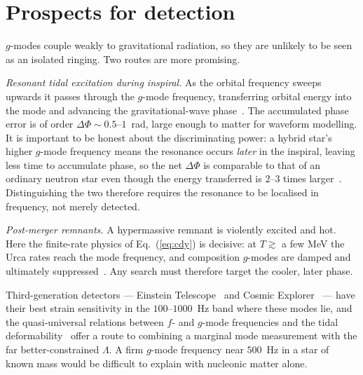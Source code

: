 \documentclass[aps,prd,twocolumn,superscriptaddress,nofootinbib,10pt]{revtex4-2}
\begin{document}
\section{Prospects for detection}

$g$-modes couple weakly to gravitational radiation, so they are unlikely to be
seen as an isolated ringing. Two routes are more promising.

\emph{Resonant tidal excitation during inspiral.} As the orbital frequency
sweeps upwards it passes through the $g$-mode frequency, transferring orbital
energy into the mode and advancing the gravitational-wave phase~\cite{Lai1994}.
The accumulated phase error is of order $\Delta\Phi\sim0.5$--$1$~rad, large
enough to matter for waveform modelling. It is important to be honest about the
discriminating power: a hybrid star's higher $g$-mode frequency means the
resonance occurs \emph{later} in the inspiral, leaving less time to accumulate
phase, so the net $\Delta\Phi$ is comparable to that of an ordinary neutron star
even though the energy transferred is $2$--$3$ times
larger~\cite{Jaikumar2021}. Distinguishing the two therefore requires the
resonance to be localised in frequency, not merely detected.

\emph{Post-merger remnants.} A hypermassive remnant is violently excited and
hot. Here the finite-rate physics of Eq.~(\ref{eq:cdy}) is decisive: at
$T\gtrsim$ a few MeV the Urca rates reach the mode frequency, and composition
$g$-modes are damped and ultimately suppressed~\cite{Counsell2025}. Any search
must therefore target the cooler, later phase.

Third-generation detectors --- Einstein Telescope~\cite{Punturo2010} and Cosmic
Explorer~\cite{Reitze2019} --- have their best strain sensitivity in the
$100$--$1000$~Hz band where these modes lie, and the quasi-universal relations
between $f$- and $g$-mode frequencies and the tidal
deformability~\cite{ZhaoLattimer2022} offer a route to combining a marginal mode
measurement with the far better-constrained $\Lambda$. A firm $g$-mode frequency
near $500$~Hz in a star of known mass would be difficult to explain with
nucleonic matter alone.

\begin{acknowledgments}
\end{acknowledgments}



\end{document}
